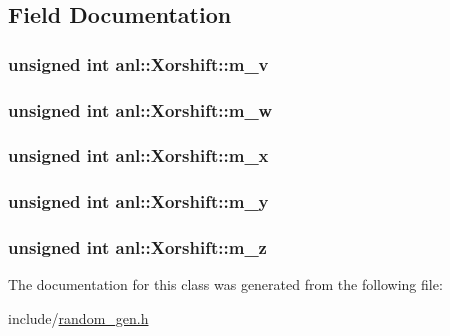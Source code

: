 \subsection{Field Documentation}
\hypertarget{classanl_1_1Xorshift_ab37edafc9c8345410e491bf36e27b0dd}{
\subsubsection[{m\_\-v}]{\setlength{\rightskip}{0pt plus 5cm}unsigned int {\bf anl::Xorshift::m\_\-v}}}
\label{classanl_1_1Xorshift_ab37edafc9c8345410e491bf36e27b0dd}
\hypertarget{classanl_1_1Xorshift_af5ba3ea5124f4f83bc0f7b2bb6e4abbf}{
\subsubsection[{m\_\-w}]{\setlength{\rightskip}{0pt plus 5cm}unsigned int {\bf anl::Xorshift::m\_\-w}}}
\label{classanl_1_1Xorshift_af5ba3ea5124f4f83bc0f7b2bb6e4abbf}
\hypertarget{classanl_1_1Xorshift_ad6be1c89d19dd0567d0ca37ae101c656}{
\subsubsection[{m\_\-x}]{\setlength{\rightskip}{0pt plus 5cm}unsigned int {\bf anl::Xorshift::m\_\-x}}}
\label{classanl_1_1Xorshift_ad6be1c89d19dd0567d0ca37ae101c656}
\hypertarget{classanl_1_1Xorshift_a1bf9c4d775f36023dbf81508f86f8d79}{
\subsubsection[{m\_\-y}]{\setlength{\rightskip}{0pt plus 5cm}unsigned int {\bf anl::Xorshift::m\_\-y}}}
\label{classanl_1_1Xorshift_a1bf9c4d775f36023dbf81508f86f8d79}
\hypertarget{classanl_1_1Xorshift_ad282813f3e294213111efd317f994f0e}{
\subsubsection[{m\_\-z}]{\setlength{\rightskip}{0pt plus 5cm}unsigned int {\bf anl::Xorshift::m\_\-z}}}
\label{classanl_1_1Xorshift_ad282813f3e294213111efd317f994f0e}


The documentation for this class was generated from the following file:\begin{DoxyCompactItemize}
\item 
include/\hyperlink{random__gen_8h}{random\_\-gen.h}\end{DoxyCompactItemize}

